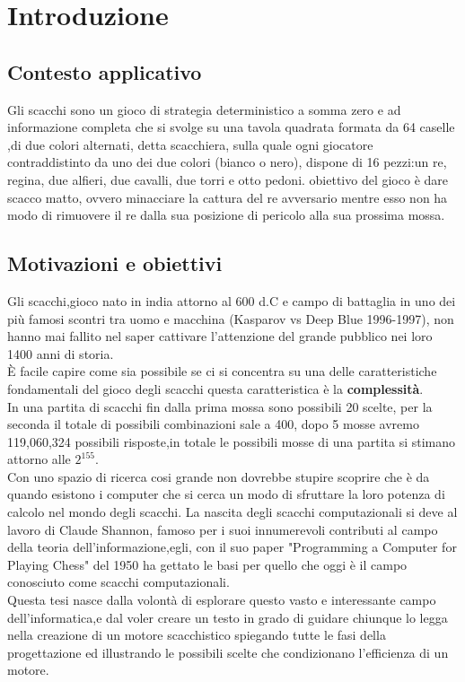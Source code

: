 \chapter{Introduzione}

\section{Contesto applicativo} %
Gli scacchi sono un gioco di strategia deterministico a somma zero e ad informazione completa  
che si svolge su una tavola quadrata formata da 64 caselle ,di due colori alternati,
detta scacchiera, sulla quale ogni giocatore contraddistinto da uno dei due colori (bianco o nero), dispone di 16 pezzi:un re, regina, due alfieri, due cavalli, due torri e otto pedoni.
obiettivo del gioco è dare scacco matto, ovvero minacciare la cattura del re avversario mentre esso non
ha modo di rimuovere il re dalla sua posizione di pericolo alla sua prossima mossa.



\section{Motivazioni e obiettivi}
Gli scacchi,gioco nato in india attorno al 600 d.C e campo di battaglia in uno dei più famosi scontri tra uomo e macchina 
(Kasparov vs Deep Blue 1996-1997), non hanno mai fallito nel saper cattivare  l'attenzione del grande pubblico nei loro 1400 anni di storia.
 \\È facile capire come sia possibile se ci si concentra su una delle caratteristiche fondamentali del 
 gioco degli scacchi  questa caratteristica è la \textbf{complessità}.\\In una partita di scacchi fin dalla prima mossa 
sono possibili 20 scelte, per la seconda  il totale di possibili combinazioni  sale a 400,
 dopo 5 mosse avremo 119,060,324 possibili risposte,in totale le possibili mosse di una partita si stimano attorno alle \(2^{155} \).
 \\Con uno spazio di ricerca cosi grande non dovrebbe stupire scoprire che è da quando esistono i computer che si cerca un modo
 di sfruttare la loro potenza di calcolo nel mondo degli scacchi.
 La nascita degli scacchi computazionali si deve al lavoro di Claude Shannon, famoso per i suoi innumerevoli contributi al 
 campo della teoria dell'informazione,egli, con il suo paper "Programming a Computer for Playing Chess"\cite{shannon} del 1950 ha gettato le
 basi per quello che oggi è il campo conosciuto come scacchi computazionali.
 \\Questa tesi nasce dalla volontà di esplorare questo vasto e interessante campo dell'informatica,e dal voler creare un testo
 in grado di guidare chiunque lo legga nella creazione di un motore scacchistico spiegando tutte le fasi della progettazione
 ed illustrando le possibili scelte che condizionano l'efficienza di un motore.

